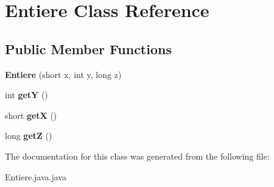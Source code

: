\hypertarget{class_entiere}{}\section{Entiere Class Reference}
\label{class_entiere}
\subsection*{Public Member Functions}
\begin{DoxyCompactItemize}
\item 
\mbox{\label{class_entiere_a0cd02adbe4c2d36bcd0f5f6eeccb2846}} 
{\bfseries Entiere} (short x, int y, long z)
\item 
\mbox{\label{class_entiere_a8a0e96226b30205d02cf8169c52849f7}} 
int {\bfseries getY} ()
\item 
\mbox{\label{class_entiere_ae286f15515d921efe50184dbe138166e}} 
short {\bfseries getX} ()
\item 
\mbox{\label{class_entiere_af509cefc8a6da7f486a4a70c23f016cb}} 
long {\bfseries getZ} ()
\end{DoxyCompactItemize}


The documentation for this class was generated from the following file\+:\begin{DoxyCompactItemize}
\item 
Entiere.\+java.\+java\end{DoxyCompactItemize}
